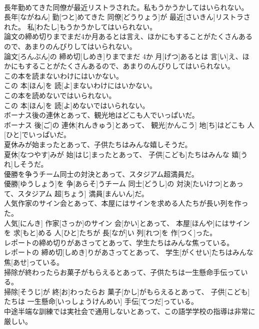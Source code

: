 \documentclass[8pt]{extreport}
\begin{document}
\begin{CJK}{UTF8}{min}
\\	長年勤めてきた同僚が最近リストラされた。私もうかうかしてはいられない。	
\\	長年[ながねん] 勤[つと]めてきた 同僚[どうりょう]が 最近[さいきん]リストラされた。 私[わたし]もうかうかしてはいられない。
\\	論文の締め切りまでまだ4か月あるとは言え、ほかにもすることがたくさんあるので、あまりのんびりしてはいられない。	
\\	論文[ろんぶん]の 締め切[しめき]りまでまだ 4か 月[げつ]あるとは 言[い]え、ほかにもすることがたくさんあるので、あまりのんびりしてはいられない。
\\	この本を読まないわけにはいかない。	
\\	この 本[ほん]を 読[よ]まないわけにはいかない。
\\	この本を読めないではいられない。	
\\	この 本[ほん]を 読[よ]めないではいられない。
\\	ボーナス後の連休とあって、観光地はどこも人でいっぱいだ。	
\\	ボーナス 後[ご]の 連休[れんきゅう]とあって、 観光[かんこう] 地[ち]はどこも 人[ひと]でいっぱいだ。
\\	夏休みが始まったとあって、子供たちはみんな嬉しそうだ。	
\\	夏休[なつやす]みが 始[はじ]まったとあって、 子供[こども]たちはみんな 嬉[うれ]しそうだ。
\\	優勝を争うチーム同士の対決とあって、スタジアム超満員だ。	
\\	優勝[ゆうしょう]を 争[あらそ]うチーム 同士[どうし]の 対決[たいけつ]とあって、スタジアム 超[ちょう] 満員[まんいん]だ。
\\	人気作家のサイン会とあって、本屋にはサインを求める人たちが長い列を作った。	
\\	人気[にんき] 作家[さっか]のサイン 会[かい]とあって、 本屋[ほんや]にはサインを 求[もと]める 人[ひと]たちが 長[なが]い 列[れつ]を 作[つく]った。
\\	レポートの締め切りがあさってとあって、学生たちはみんな焦っている。	
\\	レポートの 締め切[しめき]りがあさってとあって、 学生[がくせい]たちはみんな 焦[あせ]っている。
\\	掃除が終わったらお菓子がもらえるとあって、子供たちは一生懸命手伝っている。	
\\	掃除[そうじ]が 終[お]わったらお 菓子[かし]がもらえるとあって、 子供[こども]たちは 一生懸命[いっしょうけんめい] 手伝[てつだ]っている。
\\	中途半端な訓練では実社会で通用しないとあって、この語学学校の指導は非常に厳しい。	

\end{CJK}
\end{document}
